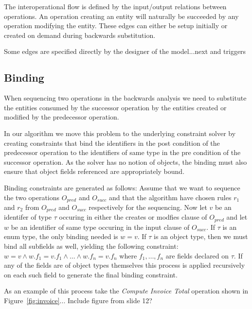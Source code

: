 The interoperational flow is defined by the input/output relations
between operations. An operation creating an entity will naturally be
succeeded by any operation modifying the entity. These edges can either
be setup initially or created on demand during backwards substitution. 

Some edges are specified directly by the designer of the model...next
and triggers

\subsection{Binding}
\label{sec:binding}

When sequencing two operations in the backwards analysis we need to
substitute the entities consumed by the successor operation by the
entities created or modified by the predecessor operation.

In our algorithm we move this problem to the underlying constraint
solver by creating constraints that bind the identifiers in the post
condition of the predecessor operation to the identifiers of same type
in the pre condition of the successor operation. As the solver has no
notion of objects, the binding must also ensure that object fields
referenced are appropriately bound.

Binding constraints are generated as follows: Assume that we want to
sequence the two operations $O_{pred}$ and $O_{succ}$ and that the
algorithm have chosen rules $r_1$ and $r_2$ from $O_{pred}$ and
$O_{succ}$ respectively for the sequencing. Now let $v$ be an
identifer of type $\tau$ occuring in either the creates or modfies
clause of $O_{pred}$ and let $w$ be an identifier of same type
occuring in the input clause of $O_{succ}$. If $\tau$ is an enum type,
the only binding needed is $w = v$. If $\tau$ is an object type, then
we must bind all subfields as well, yielding the following constraint:
$w = v \wedge w.f_1 = v.f_1 \wedge \ldots \wedge w.f_n = v.f_n$ where
$f_1, \ldots , f_n$ are fields declared on $\tau$. If any of the
fields are of object types themselves this process is applied
recursively on each such field to generate the final binding
constraint.

As an example of this process take the \emph{Compute Invoice Total}
operation shown in Figure~\ref{fig:invoice}... Include figure from
slide 12?
